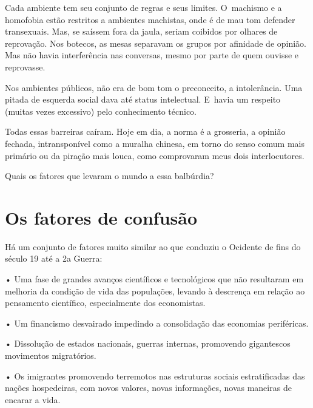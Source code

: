  

Cada ambiente tem seu conjunto de regras e seus limites. O~machismo e a
homofobia estão restritos a ambientes machistas, onde é de mau tom
defender transexuais. Mas, se saíssem fora da jaula, seriam coibidos por
olhares de reprovação. Nos botecos, as mesas separavam os grupos por
afinidade de opinião. Mas não havia interferência nas conversas, mesmo
por parte de quem ouvisse e reprovasse.

 

Nos ambientes públicos, não era de bom tom o preconceito, a
intolerância. Uma pitada de esquerda social dava até status intelectual.
E~havia um respeito (muitas vezes excessivo) pelo conhecimento técnico.

 

Todas essas barreiras caíram. Hoje em dia, a norma é a grosseria, a
opinião fechada, intransponível como a muralha chinesa, em torno do
senso comum mais primário ou da piração mais louca, como comprovaram
meus dois interlocutores.

 

Quais os fatores que levaram o mundo a essa balbúrdia?

 

\section{Os fatores de confusão}

 

Há um conjunto de fatores muito similar ao que conduziu o Ocidente de
fins do século 19 até a 2a Guerra:

 

• Uma fase de grandes avanços científicos e tecnológicos que não
resultaram em melhoria da condição de vida das populações, levando à
descrença em relação ao pensamento científico, especialmente dos
economistas.

 

• Um financismo desvairado impedindo a consolidação das economias
periféricas.

 

• Dissolução de estados nacionais, guerras internas, promovendo
gigantescos movimentos migratórios.

 

• Os imigrantes promovendo terremotos nas estruturas sociais
estratificadas das nações hospedeiras, com novos valores, novas
informações, novas maneiras de encarar a vida.

 

